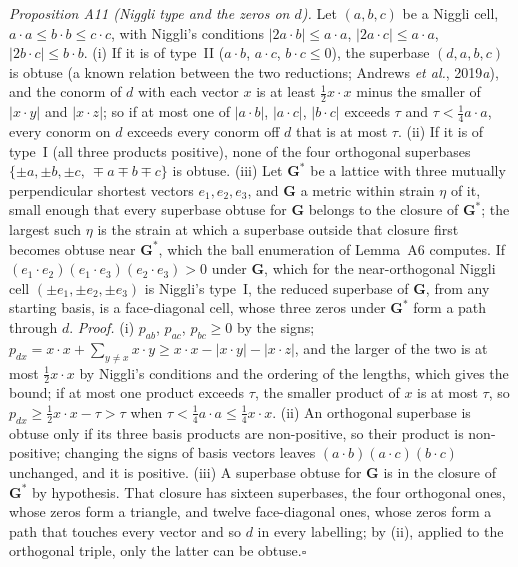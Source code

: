 \documentclass[preprint,pdf]{iucr}          %
\newcommand{\Gmet}{\mathbf{G}}
\begin{document}
\emph{Proposition A11 (Niggli type and the zeros on $d$).} Let $(a,b,c)$ be a Niggli cell, $a\cdot a\le b\cdot b\le c\cdot c$, with Niggli's conditions $|2a\cdot b|\le a\cdot a$, $|2a\cdot c|\le a\cdot a$, $|2b\cdot c|\le b\cdot b$. (i) If it is of type~II ($a\cdot b$, $a\cdot c$, $b\cdot c\le0$), the superbase $(d,a,b,c)$ is obtuse (a known relation between the two reductions; Andrews \emph{et al.}, 2019\emph{a}), and the conorm of $d$ with each vector $x$ is at least $\frac12x\cdot x$ minus the smaller of $|x\cdot y|$ and $|x\cdot z|$; so if at most one of $|a\cdot b|$, $|a\cdot c|$, $|b\cdot c|$ exceeds $\tau$ and $\tau<\frac14a\cdot a$, every conorm on $d$ exceeds every conorm off $d$ that is at most $\tau$. (ii) If it is of type~I (all three products positive), none of the four orthogonal superbases $\{\pm a,\pm b,\pm c,\ \mp a\mp b\mp c\}$ is obtuse. (iii) Let $\Gmet^*$ be a lattice with three mutually perpendicular shortest vectors $e_1,e_2,e_3$, and $\Gmet$ a metric within strain $\eta$ of it, small enough that every superbase obtuse for $\Gmet$ belongs to the closure of $\Gmet^*$; the largest such $\eta$ is the strain at which a superbase outside that closure first becomes obtuse near $\Gmet^*$, which the ball enumeration of Lemma~A6 computes. If $(e_1\cdot e_2)(e_1\cdot e_3)(e_2\cdot e_3)>0$ under $\Gmet$, which for the near-orthogonal Niggli cell $(\pm e_1,\pm e_2,\pm e_3)$ is Niggli's type~I, the reduced superbase of $\Gmet$, from any starting basis, is a face-diagonal cell, whose three zeros under $\Gmet^*$ form a path through $d$. \emph{Proof.} (i) $p_{ab}$, $p_{ac}$, $p_{bc}\ge0$ by the signs; $p_{dx}=x\cdot x+\sum_{y\ne x}x\cdot y\ge x\cdot x-|x\cdot y|-|x\cdot z|$, and the larger of the two is at most $\frac12x\cdot x$ by Niggli's conditions and the ordering of the lengths, which gives the bound; if at most one product exceeds $\tau$, the smaller product of $x$ is at most $\tau$, so $p_{dx}\ge\frac12x\cdot x-\tau>\tau$ when $\tau<\frac14a\cdot a\le\frac14x\cdot x$. (ii) An orthogonal superbase is obtuse only if its three basis products are non-positive, so their product is non-positive; changing the signs of basis vectors leaves $(a\cdot b)(a\cdot c)(b\cdot c)$ unchanged, and it is positive. (iii) A superbase obtuse for $\Gmet$ is in the closure of $\Gmet^*$ by hypothesis. That closure has sixteen superbases, the four orthogonal ones, whose zeros form a triangle, and twelve face-diagonal ones, whose zeros form a path that touches every vector and so $d$ in every labelling; by (ii), applied to the orthogonal triple, only the latter can be obtuse.\hfill$\square$
\end{document}
